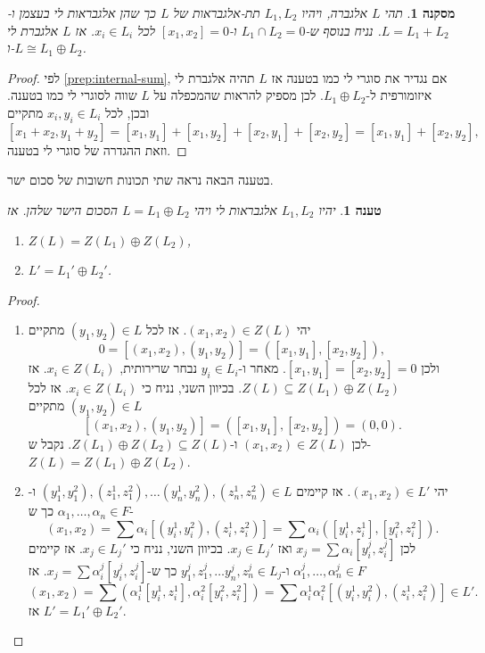 \documentclass{report}
\theoremstyle{break}
\newtheorem{preposition}[preposition]{טענה}
\newtheorem{corollary}[corollary]{מסקנה}
\theoremstyle{MyNonumberbreak}
\newtheorem{proof}{הוכחה}
\begin{document}
\begin{corollary} \label{cor:internal-sum}
	תהי $L$ אלגברה, ויהיו $L_1, L_2$ תת-אלגבראות של $L$ כך שהן אלגבראות לי בעצמן ו-$L = L_1  + L_2$. נניח בנוסף ש-$L_1 \cap L_2 = 0$ ו-$[x_1, x_2] = 0$ לכל $x_i \in L_i$. אז $L$ אלגברת לי ו-$L \cong L_1 \oplus L_2$.
\end{corollary}
\begin{proof}
	לפי \autoref*{prep:internal-sum}, אם נגדיר את סוגרי לי כמו בטענה אז $L$ תהיה אלגברת לי איזומורפית ל-$L_1 \oplus L_2$. לכן מספיק להראות שהמכפלה על $L$ שווה לסוגרי לי כמו בטענה. ובכן, לכל $x_i, y_i \in L_i$ מתקיים
	\[ [x_1 + x_2, y_1 + y_2] = [x_1, y_1] + [x_1, y_2] + [x_2, y_1] + [x_2, y_2] = [x_1, y_1] + [x_2, y_2], \]
	וזאת ההגדרה של סוגרי לי בטענה.
\end{proof}
בטענה הבאה נראה שתי תכונות חשובות של סכום ישר.
\begin{preposition} \label{prep:centre-derived-sum}
	יהיו $L_1, L_2$ אלגבראות לי ויהי $L = L_1 \oplus L_2$ הסכום הישר שלהן. אז
	\begin{enumerate}
		\item $Z(L) = Z(L_1) \oplus Z(L_2)$,
		\item $L' = L_1' \oplus L_2'$.
	\end{enumerate}
\end{preposition}
\begin{proof}
\begin{enumerate}
	\item 
יהי $(x_1,x_2) \in Z(L)$. אז לכל $(y_1,y_2) \in L$ מתקיים
\[ 0 = [(x_1,x_2), (y_1, y_2)] = ([x_1, y_1], [x_2, y_2]), \]
ולכן $[x_1, y_1] = [x_2, y_2] = 0$. מאחר ו-$y_i \in L_i$ נבחר שרירותית, $x_i \in Z(L_i)$. אז $Z(L) \subseteq Z(L_1) \oplus Z(L_2)$. בכיוון השני, נניח כי $x_i \in Z(L_i)$. אז לכל $(y_1, y_2) \in L$ מתקיים
\[ [(x_1, x_2), (y_1, y_2)] = ([x_1, y_1], [x_2, y_2]) = (0, 0). \]
לכן $(x_1, x_2) \in Z(L)$ ו-$Z(L_1) \oplus Z(L_2) \subseteq Z(L)$. נקבל ש-$Z(L) = Z(L_1) \oplus Z(L_2)$.
	\item
	יהי $(x_1, x_2) \in L'$. אז קיימים $(y^1_1, y^2_1), (z^1_1, z^2_1), \ldots (y^1_n, y^2_n), (z^1_n, z^2_n) \in L$ ו-$\alpha_1, \ldots, \alpha_n \in F$ כך ש-
\[(x_1, x_2) = \sum \alpha_i [(y^1_i, y^2_i), (z^1_i, z^2_i)] = \sum \alpha_i ([y^1_i, z^1_i], [y^2_i, z^2_i]). \]
לכן $x_j = \sum \alpha_i [y^j_i, z^j_i]$ ואז $x_j \in L_j'$. בכיוון השני, נניח כי $x_j \in L_j'$. אז קיימים $\alpha^j_1, \ldots, \alpha^j_n \in F$ ו-$y^j_1, z^j_1, \ldots y^j_n, z^j_n \in L_j$ כך ש-$x_j = \sum \alpha^j_i [y^j_i, z^j_i]$. אז
\[ (x_1, x_2) = \sum (\alpha^1_i[y^1_i, z^1_i], \alpha^2_i[y^2_i, z^2_i]) = \sum \alpha^1_i \alpha^2_i [(y^1_i, y^2_i), (z^1_i, z^2_i)] \in L'. \]
אז $L' = L_1' \oplus L_2'$.
\end{enumerate}
\end{proof}
\end{document}
